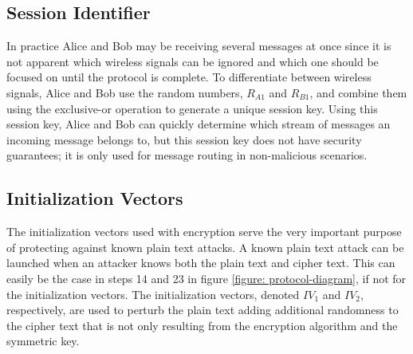 \documentclass[12pt]{report}
\begin{document}
\subsection{Session Identifier}
In practice Alice and Bob may be receiving several messages at once since it is not apparent which wireless signals can be ignored and which one should be focused on until the protocol is complete. To differentiate between wireless signals, Alice and Bob use the random numbers, $R_{A1}$ and $R_{B1}$, and combine them using the exclusive-or operation to generate a unique session key. Using this session key, Alice and Bob can quickly determine which stream of messages an incoming message belongs to, but this session key does not have security guarantees; it is only used for message routing in non-malicious scenarios. \par

\subsection{Initialization Vectors}
The initialization vectors used with encryption serve the very important purpose of protecting against known plain text attacks. A known plain text attack can be launched when an attacker knows both the plain text and cipher text. This can easily be the case in steps 14 and 23 in figure \ref{figure: protocol-diagram}, if not for the initialization vectors. The initialization vectors, denoted $IV_{1}$ and $IV_{2}$, respectively, are used to perturb the plain text adding additional randomness to the cipher text that is not only resulting from the encryption algorithm and the symmetric key. \par
\end{document}
